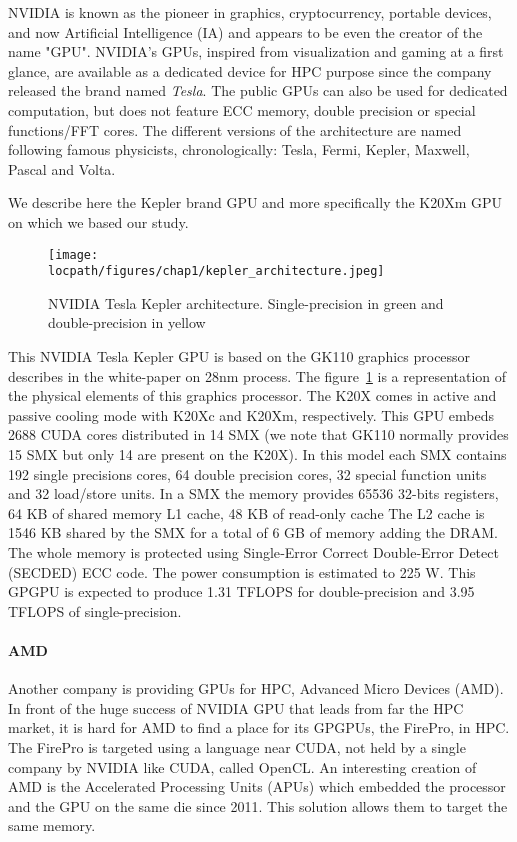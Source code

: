 NVIDIA is known as the pioneer in graphics, cryptocurrency, portable devices, and now Artificial Intelligence (IA) and appears to be even the creator of the name "GPU".
NVIDIA's GPUs, inspired from visualization and gaming at a first glance, are available as a dedicated device for HPC purpose since the company released the brand named \textit{Tesla}. 
The public GPUs can also be used for dedicated computation, but does not feature ECC memory, double precision or special functions/FFT cores. 
The different versions of the architecture are named following famous physicists, chronologically: Tesla, Fermi, Kepler, Maxwell, Pascal and Volta.

We describe here the Kepler brand GPU and more specifically the K20Xm GPU on which we based our study. 
\begin{figure}
\centering
\texttt{[image: \\locpath/figures/chap1/kepler\_architecture.jpeg]}
\caption{NVIDIA Tesla Kepler architecture. Single-precision in green and double-precision in yellow}
\label{fig:2_HARD:kepler_arch}
\end{figure}
This NVIDIA Tesla Kepler GPU is based on the GK110 graphics processor describes in the white-paper\cite{nvidia2012nvidias} on 28nm process.
The figure~\ref{fig:2_HARD:kepler_arch} is a representation of the physical elements of this graphics processor. 
The K20X comes in active and passive cooling mode with K20Xc and K20Xm, respectively.
This GPU embeds 2688 CUDA cores distributed in 14 SMX (we note that GK110 normally provides 15 SMX but only 14 are present on the K20X).
In this model each SMX contains 192 single precisions cores, 64 double precision cores, 32 special function units and 32 load/store units.
In a SMX the memory provides 65536 32-bits registers, 64 KB of shared memory L1 cache, 48 KB of read-only cache
The L2 cache is 1546 KB shared by the SMX for a total of 6 GB of memory adding the DRAM.
The whole memory is protected using Single‐Error Correct Double‐Error Detect (SECDED) ECC code.
The power consumption is estimated to 225 W.
This GPGPU is expected to produce 1.31 TFLOPS for double-precision and 3.95 TFLOPS of single-precision.

\paragraph{AMD}
Another company is providing GPUs for HPC, Advanced Micro Devices (AMD). 
In front of the huge success of NVIDIA GPU that leads from far the HPC market, it is hard for AMD to find a place for its GPGPUs, the FirePro, in HPC. 
The FirePro is targeted using a language near CUDA, not held by a single company by NVIDIA like CUDA, called OpenCL. 
An interesting creation of AMD is the Accelerated Processing Units (APUs) which embedded the processor and the GPU on the same die since 2011. 
This solution allows them to target the same memory. 

